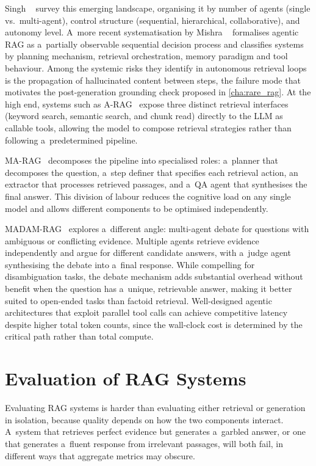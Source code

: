 Singh \etal~\cite{singh2025agenticrag} survey this emerging landscape, organising
it by number of agents (single vs.\ multi-agent), control structure (sequential,
hierarchical, collaborative), and autonomy level.
A~more recent systematisation by Mishra \etal~\cite{mishra2026sokagentic} formalises
agentic RAG as a~partially observable sequential decision process and classifies
systems by planning mechanism, retrieval orchestration, memory paradigm and tool
behaviour.
Among the systemic risks they identify in autonomous retrieval loops is the
propagation of hallucinated content between steps, the failure mode that
motivates the post-generation grounding check proposed in \cref{cha:rare_rag}.
At the high end, systems such as A-RAG~\cite{du2026arag} expose three distinct
retrieval interfaces (keyword search, semantic search, and chunk read) directly
to the LLM as callable tools, allowing the model to compose retrieval strategies
rather than following a~predetermined pipeline.

MA-RAG~\cite{nguyen2025marag} decomposes the pipeline into specialised roles:
a~planner that decomposes the question, a~step definer that specifies each retrieval
action, an extractor that processes retrieved passages, and a~QA agent that synthesises
the final answer.
This division of labour reduces the cognitive load on any single model and allows
different components to be optimised independently.

MADAM-RAG~\cite{wang2025madamrag} explores a~different angle: multi-agent debate
for questions with ambiguous or conflicting evidence.
Multiple agents retrieve evidence independently and argue for different candidate
answers, with a~judge agent synthesising the debate into a~final response.
While compelling for disambiguation tasks, the debate mechanism adds substantial
overhead without benefit when the question has a~unique, retrievable answer,
making it better suited to open-ended tasks than factoid retrieval.
Well-designed agentic architectures that exploit parallel tool calls can achieve
competitive latency despite higher total token counts, since the wall-clock cost
is determined by the critical path rather than total compute.

\section{Evaluation of RAG Systems}
\label{sec:rag_evaluation}

Evaluating RAG systems is harder than evaluating either retrieval or generation
in isolation, because quality depends on how the two components interact.
A~system that retrieves perfect evidence but generates a~garbled answer, or one that
generates a~fluent response from irrelevant passages, will both fail, in different
ways that aggregate metrics may obscure.


